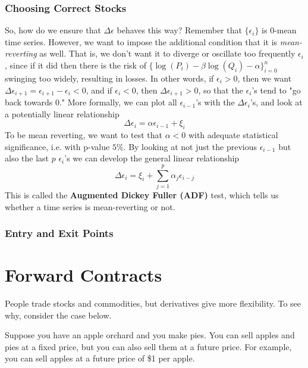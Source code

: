 \documentclass{article}
\begin{document}
    \subsubsection{Choosing Correct Stocks}

      So, how do we ensure that $\Delta \epsilon$ behaves this way? Remember that $\{\epsilon_i\}$ is $0$-mean time series. However, we want to impose the additional condition that it is \textit{mean-reverting} as well. That is, we don't want it to diverge or oscillate too frequently $\epsilon_i$, since if it did then there is the risk of $\{\log(P_i) - \beta \log(Q_i) - \alpha\}_{i=0}^n$ swinging too widely, resulting in losses. In other words, if $\epsilon_i > 0$, then we want $\Delta \epsilon_{i + 1} = \epsilon_{i+1} - \epsilon_i < 0$, and if $\epsilon_i < 0$, then $\Delta \epsilon_{i+1} > 0$, so that the $\epsilon_i$'s tend to "go back towards $0$." More formally, we can plot all $\epsilon_{i-1}$'s with the $\Delta \epsilon_i$'s, and look at a potentially linear relationship 
      \[\Delta \epsilon_i = \alpha \epsilon_{i-1} + \xi_i\]
      To be mean reverting, we want to test that $\alpha < 0$ with adequate statistical significance, i.e. with p-value $5\%$. By looking at not just the previous $\epsilon_{i-1}$ but also the last $p$ $\epsilon_i$'s we can develop the general linear relationship 
      \[\Delta \epsilon_i = \xi_i + \sum_{j=1}^p \alpha_j \epsilon_{i - j}\]
      This is called the \textbf{Augmented Dickey Fuller (ADF)} test, which tells us whether a time series is mean-reverting or not. 

    \subsubsection{Entry and Exit Points}

\section{Forward Contracts} 

    People trade stocks and commodities, but derivatives give more flexibility. To see why, consider the case below. 

    \begin{example}
      Suppose you have an apple orchard and you make pies. You can sell apples and pies at a fixed price, but you can also sell them at a future price. For example, you can sell apples at a future price of \$1 per apple. 
    \end{example}
\end{document}
